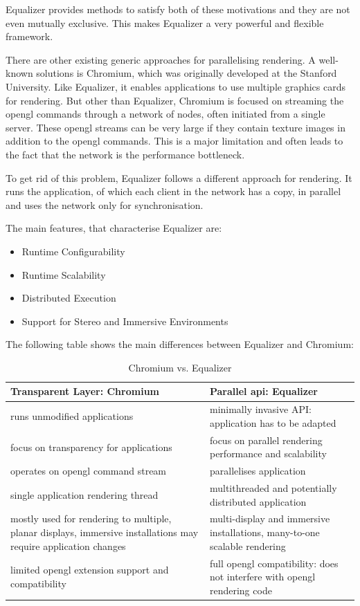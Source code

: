 Equalizer provides methods to satisfy both of these motivations and they are not even mutually exclusive. This makes Equalizer a very powerful and flexible framework.

There are other existing generic approaches for parallelising rendering. A well-known solutions is Chromium, which was originally developed at the Stanford University. Like Equalizer, it enables applications to use multiple graphics cards for rendering. But other than Equalizer, Chromium is focused on streaming the \gls{opengl} commands through a network of nodes, often initiated from a single server. These \gls{opengl} streams can be very large if they contain texture images in addition to the \gls{opengl} commands. This is a major limitation and often leads to the fact that the network is the performance bottleneck.

To get rid of this problem, Equalizer follows a different approach for rendering. It runs the application, of which each client in the network has a copy, in parallel and uses the network only for synchronisation. 

The main features, that characterise Equalizer are:
\begin{itemize}
\item Runtime Configurability
\item Runtime Scalability
\item Distributed Execution
\item Support for Stereo and Immersive Environments
\end{itemize}

The following table shows the main differences between Equalizer and Chromium:

\begin{table}[H]
\centering
\begin{tabular}{|p{}|p{}|}
	\hline
	\bfseries Transparent Layer: Chromium & \bfseries Parallel \gls{api}: Equalizer \\
	\hline
	\hline 
	runs unmodified applications & minimally invasive API: application has to be adapted \\
	\hline
	focus on transparency for applications & focus on parallel rendering performance and scalability \\
	\hline
	operates on \gls{opengl} command stream & parallelises application \\
	\hline
	single application rendering thread & multithreaded and potentially distributed application \\
	\hline
	mostly used for rendering to multiple, planar displays, immersive installations may require application changes & multi-display and immersive installations, many-to-one scalable rendering \\
	\hline
	limited \gls{opengl} extension support and compatibility & full \gls{opengl} compatibility: does not interfere with \gls{opengl} rendering code \\
	\hline
\end{tabular}
\caption{Chromium vs. Equalizer\cite{website:equalizer}}
\end{table}

